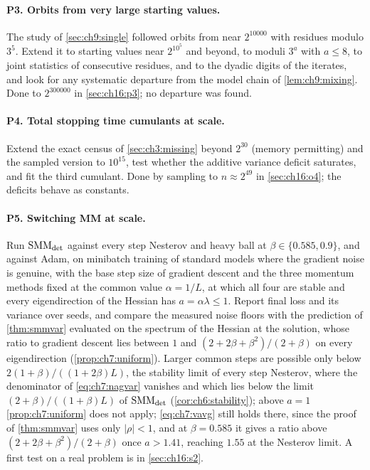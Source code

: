 \paragraph{P3. Orbits from very large starting values.} The study of
\cref{sec:ch9:single} followed orbits from near $2^{10000}$ with residues
modulo $3^5$. Extend it to starting values near $2^{10^5}$ and beyond, to moduli
$3^a$ with $a\le8$, to joint statistics of consecutive residues, and to the
dyadic digits of the iterates, and look for any systematic departure from
the model chain of \cref{lem:ch9:mixing}.
Done to $2^{300000}$ in \cref{sec:ch16:p3}; no departure was found.

\paragraph{P4. Total stopping time cumulants at scale.} Extend the exact census of
\cref{sec:ch3:missing} beyond $2^{30}$ (memory permitting) and the sampled
version to $10^{15}$, test whether the additive variance deficit saturates,
and fit the third cumulant.
Done by sampling to $n\approx2^{49}$ in \cref{sec:ch16:o4}; the deficits behave as constants.

\paragraph{P5. Switching MM at scale.} Run $\mathrm{SMM}_{\mathrm{det}}$ against every step
Nesterov and heavy ball at $\beta\in\{0.585,0.9\}$, and against Adam, on
minibatch training of standard models where the gradient noise is genuine,
with the base step size of gradient descent and the three momentum methods fixed at the common value $\alpha=1/L$, at which all four are stable and every eigendirection of the Hessian has $a=\alpha\lambda\le1$.
Report final loss and its variance over seeds, and compare the measured noise floors with the prediction of \cref{thm:smmvar} evaluated on the spectrum of the Hessian at the solution, whose ratio to gradient descent lies between $1$ and $(2+2\beta+\beta^2)/(2+\beta)$ on every eigendirection (\cref{prop:ch7:uniform}). Larger common steps are possible only below $2(1+\beta)/((1+2\beta)L)$, the stability limit of every step Nesterov, where the denominator of \eqref{eq:ch7:nagvar} vanishes and which lies below the limit $(2+\beta)/((1+\beta)L)$ of $\mathrm{SMM}_{\mathrm{det}}$ (\cref{cor:ch6:stability}); above $a=1$ \cref{prop:ch7:uniform} does not apply; \eqref{eq:ch7:vavg} still holds there, since the proof of \cref{thm:smmvar} uses only $|\rho|<1$, and at $\beta=0.585$ it gives a ratio above $(2+2\beta+\beta^2)/(2+\beta)$ once $a>1.41$, reaching $1.55$ at the Nesterov limit.
A first test on a real problem is in \cref{sec:ch16:s2}.

